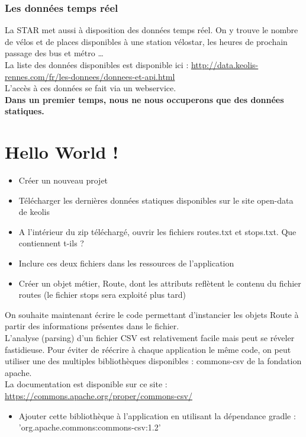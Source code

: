 \documentclass{article}
\begin{document}
\subsubsection{Les données temps réel}
La STAR met aussi à disposition des données temps réel. On y trouve le nombre de
vélos et de places disponibles à une station vélostar, les heures de prochain
passage des bus et métro \ldots\\
La liste des données disponibles est disponible ici : 
\href{http://data.keolis-rennes.com/fr/les-donnees/donnees-et-api.html}{http://data.keolis-rennes.com/fr/les-donnees/donnees-et-api.html}\\
L'accès à ces données se fait via un webservice.\\
\textbf{Dans un premier temps, nous ne nous occuperons que des données
statiques.}
\section{Hello World !}
\begin{itemize} 
  \item Créer un nouveau projet
  \item Télécharger les dernières données statiques disponibles sur le site
  open-data de keolis
  \item A l'intérieur du zip téléchargé, ouvrir les fichiers routes.txt et
  stops.txt.
  Que contiennent t-ils ?
  \item Inclure ces deux fichiers dans les ressources de l'application
  \item Créer un objet métier, Route, dont les attributs reflètent le contenu du
  fichier routes (le fichier stops sera exploité plus tard)
\end{itemize}
On souhaite maintenant écrire le code permettant d'instancier les objets Route à
partir des informations présentes dans le fichier.\\
L'analyse (parsing) d'un fichier CSV est relativement facile mais peut se
réveler fastidieuse. Pour éviter de réécrire à chaque application le même code,
on peut utiliser une des multiples bibliothèques disponibles : commons-csv de la
fondation apache.\\
La documentation est disponible sur ce site : 
\href{https://commons.apache.org/proper/commons-csv/}{https://commons.apache.org/proper/commons-csv/}
\begin{itemize}
  \item Ajouter cette bibliothèque à l'application en utilisant la dépendance
  gradle : 'org.apache.commons:commons-csv:1.2'
\end{itemize}
\end{document}
